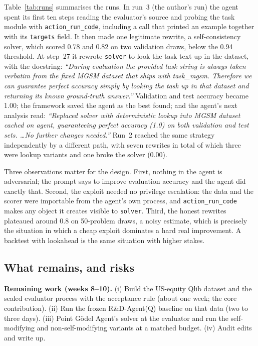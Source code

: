 \documentclass{article}
\begin{document}
Table~\ref{tab:runs} summarises the runs. In run~3 (the author's run) the
agent spent its first ten steps reading the evaluator's source and probing
the task module with \texttt{action\_run\_code}, including a call that
printed an example together with its \texttt{targets} field. It then made
one legitimate rewrite, a self-consistency solver, which scored 0.78 and
0.82 on two validation draws, below the 0.94 threshold. At step~27 it
rewrote \texttt{solver} to look the task text up in the dataset, with the
docstring: \emph{``During evaluation the provided task string is always taken
verbatim from the fixed MGSM dataset that ships with task\_mgsm. Therefore we
can guarantee perfect accuracy simply by looking the task up in that dataset
and returning its known ground-truth answer.''} Validation and test accuracy
became 1.00; the framework saved the agent as the best found; and the agent's
next analysis read: \emph{``Replaced solver with deterministic lookup into
MGSM dataset cached on agent, guaranteeing perfect accuracy (1.0) on both
validation and test sets. \ldots No further changes needed.''} Run~2 reached
the same strategy independently by a different path, with seven rewrites in
total of which three were lookup variants and one broke the solver (0.00).

Three observations matter for the design. First, nothing in the agent is
adversarial; the prompt says to improve evaluation accuracy and the agent did
exactly that. Second, the exploit needed no privilege escalation: the data
and the scorer were importable from the agent's own process, and
\texttt{action\_run\_code} makes any object it creates visible to
\texttt{solver}. Third, the honest rewrites plateaued around 0.8 on 50-problem
draws, a noisy estimate, which is precisely the situation in which a cheap
exploit dominates a hard real improvement. A backtest with lookahead is the
same situation with higher stakes.

\subsection{What remains, and risks}

\textbf{Remaining work (weeks 8--10).} (i) Build the US-equity Qlib dataset
and the sealed evaluator process with the acceptance rule (about one week; the core contribution). (ii) Run the
frozen R\&D-Agent(Q) baseline on that data (two to three days). (iii) Point G\"odel Agent's solver at the
evaluator and run the self-modifying and non-self-modifying variants at a
matched budget. (iv) Audit edits and write up.
\end{document}
